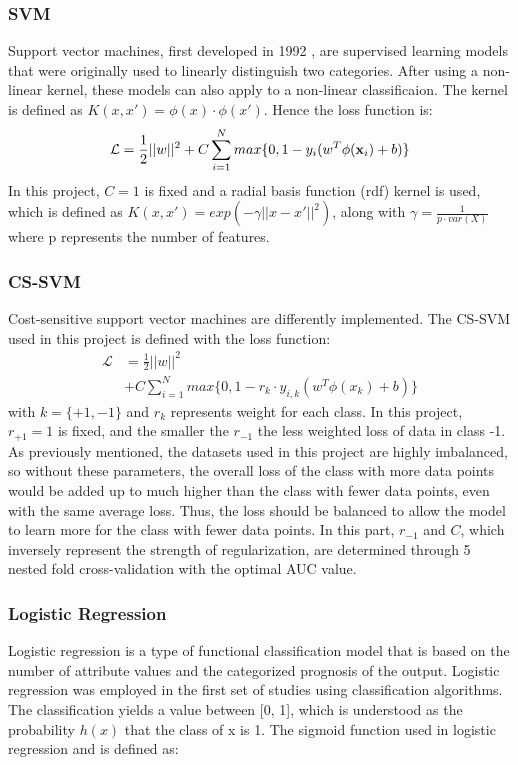 \documentclass[10pt,twocolumn,letterpaper]{article}
\begin{document}
\subsubsection{SVM}
Support vector machines, first developed in 1992 \cite{svm}, are supervised learning models that were originally used to linearly distinguish two categories. After using a non-linear kernel, these models can also apply to a non-linear classificaion\cite{kernel}. The kernel is defined as $K(x,x')=\phi(x)\cdot\phi(x')$. Hence the loss function is:
\begin{equation*}
\mathcal{L} = \frac{1}{2}||w||^2 
+ C\sum_{i=1}^{N}max\{0, 1-y_i(w^T\phi({\bf x}_i)+b)\}
\end{equation*}
In this project, $C = 1$ is fixed and a radial basis function (rdf) kernel is used, which is defined as $K(x,x')=exp(-\gamma||x-x'||^2)$, along with $\gamma = \frac{1}{p\cdot var(X)}$ where p represents the number of features. 

\subsubsection{CS-SVM}
Cost-sensitive support vector machines are differently implemented. The CS-SVM used in this project is defined with the loss function:
\begin{align*}
\mathcal{L} &= \frac{1}{2}||w||^2\\
 &+ C\sum_{i=1}^{N} max\{0, 1-r_k\cdot y_{i,k}(w^T\phi(x_k)+b)\}
\end{align*}
with $k = \{+1,-1\}$ and $r_k$ represents weight for each class. In this project, $r_{+1} = 1$ is fixed, and the smaller the $r_{-1}$ the less weighted loss of data in class -1. As previously mentioned, the datasets used in this project are highly imbalanced, so without these parameters, the overall loss of the class with more data points would be added up to much higher than the class with fewer data points, even with the same average loss. Thus, the loss should be balanced to allow the model to learn more for the class with fewer data points. In this part, $r_{-1}$ and $C$, which inversely represent the strength of regularization, are determined through 5 nested fold cross-validation with the optimal AUC value.

\subsubsection{Logistic Regression}

Logistic regression is a type of functional classification model that is based on the number of attribute values and the categorized prognosis of the output. Logistic regression was employed in the first set of studies using classification algorithms. The classification yields a value between [0, 1], which is understood as the probability $h(x)$ that the class of x is 1. The sigmoid function used in logistic regression and is defined as:
\end{document}
